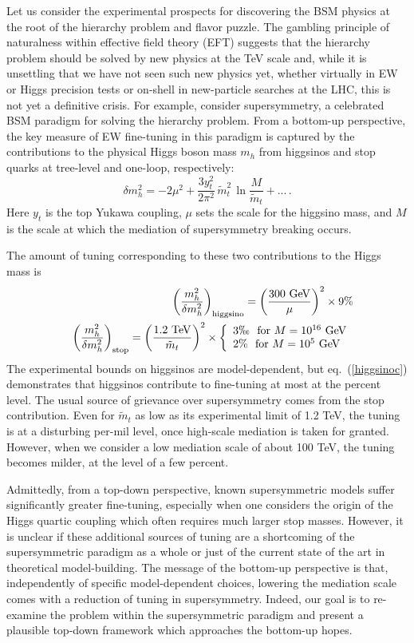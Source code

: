 \documentclass[a4paper,12pt]{article}
\newcommand{\tev}{\textrm{TeV}}
\newcommand{\gev}{\textrm{GeV}}
\newcommand{\bea}{\begin{eqnarray}}
\newcommand{\eea}{\end{eqnarray}}
\def\eq#1{eq.~(\ref{#1})}
\def\eq#1{eq.~(\ref{#1})}
\begin{document}
Let us consider the experimental prospects for discovering the BSM physics at the root of the hierarchy problem and flavor puzzle. The gambling principle of naturalness within effective field theory (EFT) suggests that the hierarchy problem should be solved by new physics at the TeV scale and, while it is unsettling that we have not seen such new physics yet, whether virtually in EW or Higgs precision tests or on-shell in new-particle searches at the LHC, this is not yet a definitive crisis. For example, consider supersymmetry, a celebrated BSM paradigm for solving the hierarchy problem. 
From a bottom-up perspective, the key measure of EW fine-tuning in this paradigm is captured by the contributions to the physical Higgs boson mass $m_h$ from higgsinos and stop quarks at tree-level and one-loop, respectively:
\begin{equation}
    \delta m_h^2 = - 2 \mu^2 + \frac{3 y_t^2}{2 \pi^2} \, {\tilde m}_t^2 \, \ln \frac{M}{{\tilde m}_t} + ... \, .
    \label{massHbu}
\end{equation}
Here $y_t$ is the top Yukawa coupling, $\mu$ sets the scale for the higgsino mass, and $M$ is the scale at which the mediation of supersymmetry breaking occurs.

The amount of tuning corresponding to these two contributions to the Higgs mass is
\bea
&&\left( \frac{m_h^2}{\delta m_h^2}\right)_{\textrm{higgsino}} =  \left( \frac{300~\gev}{\mu}\right)^2 \times 9\%
\label{higgsinoc}
\\
&&\left( \frac{m_h^2}{\delta m_h^2}\right)_{\textrm{stop}} =  \left( \frac{1.2~\tev}{{\tilde m}_t}\right)^2 \times \left\{
\begin{array}{l}
3\permil ~~\textrm{for}~M=10^{16}~\gev \\
2\% ~~\textrm{for}~M=10^{5}~\gev
\end{array}
\right.
\label{stopc}
\eea
The experimental bounds on higgsinos are model-dependent, but \eq{higgsinoc} demonstrates that higgsinos contribute to fine-tuning at most at the percent level. The usual source of grievance over supersymmetry comes from the stop contribution. Even for ${\tilde m}_t$ as low as its experimental limit of 1.2 TeV, the tuning is at a disturbing per-mil level, once high-scale mediation is taken for granted.  However, when we consider a low mediation scale of about 100 TeV, the tuning becomes milder, at the level of a few percent.

Admittedly, from a top-down perspective, known supersymmetric models suffer significantly greater fine-tuning, especially when one considers the origin of the Higgs quartic coupling which often requires much larger stop masses. However, it is unclear if these additional sources of tuning are a shortcoming of the supersymmetric paradigm as a whole or just of the current state of the art in theoretical model-building. The message of
 the bottom-up perspective is that, independently of specific model-dependent choices, lowering the mediation scale comes with a reduction of tuning in supersymmetry.  Indeed, our goal is to re-examine the problem within the supersymmetric paradigm and 
present a plausible top-down framework which approaches the bottom-up hopes. 
\end{document}
